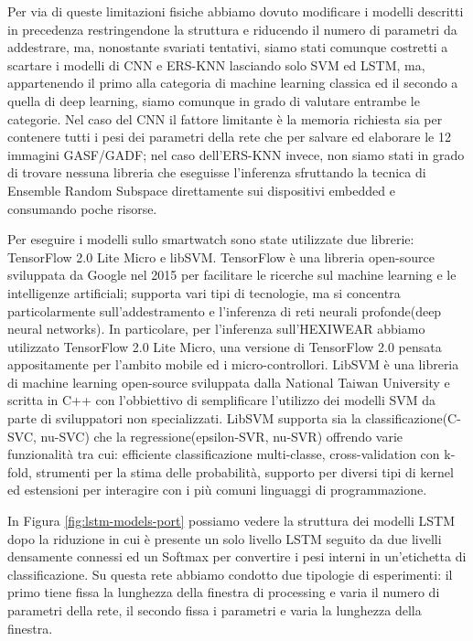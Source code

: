 Per via di queste limitazioni fisiche abbiamo dovuto modificare i modelli descritti in precedenza restringendone la struttura e riducendo il numero di parametri da addestrare, ma, nonostante svariati tentativi, siamo stati comunque costretti a scartare i modelli di CNN e ERS-KNN lasciando solo SVM ed LSTM, ma, appartenendo il primo alla categoria di machine learning classica ed il secondo a quella di deep learning, siamo comunque in grado di valutare entrambe le categorie. Nel caso del CNN il fattore limitante è la memoria richiesta sia per contenere tutti i pesi dei parametri della rete che per salvare ed elaborare le 12 immagini GASF/GADF; nel caso dell'ERS-KNN invece, non siamo stati in grado di trovare nessuna libreria che eseguisse l'inferenza sfruttando la tecnica di Ensemble Random Subspace direttamente sui dispositivi embedded e consumando poche risorse.

Per eseguire i modelli sullo smartwatch sono state utilizzate due librerie: TensorFlow 2.0 Lite Micro e libSVM.
TensorFlow è una libreria open-source sviluppata da Google nel 2015 per facilitare le ricerche sul machine learning e le intelligenze artificiali; supporta vari tipi di tecnologie, ma si concentra particolarmente sull'addestramento e l'inferenza di reti neurali profonde(deep neural networks)\cite{abadi2016tensorflow}. In particolare, per l'inferenza sull'HEXIWEAR abbiamo utilizzato TensorFlow 2.0 Lite Micro, una versione di TensorFlow 2.0 pensata appositamente per l'ambito mobile ed i micro-controllori. 
LibSVM\cite{chang2011libsvm} è una libreria di machine learning open-source sviluppata dalla National Taiwan University e scritta in C++ con l'obbiettivo di semplificare l'utilizzo dei modelli SVM da parte di sviluppatori non specializzati. LibSVM supporta sia la classificazione(C-SVC, nu-SVC) che la regressione(epsilon-SVR, nu-SVR) offrendo varie funzionalità tra cui: efficiente classificazione multi-classe, cross-validation con k-fold, strumenti per la stima delle probabilità, supporto per diversi tipi di kernel ed estensioni per interagire con i più comuni linguaggi di programmazione.

In Figura \ref{fig:lstm-models-port} possiamo vedere la struttura dei modelli LSTM dopo la riduzione in cui è presente un solo livello LSTM seguito da due livelli densamente connessi ed un Softmax per convertire i pesi interni in un'etichetta di classificazione. Su questa rete abbiamo condotto due tipologie di esperimenti: il primo tiene fissa la lunghezza della finestra di processing e varia il numero di parametri della rete, il secondo fissa i parametri e varia la lunghezza della finestra.

